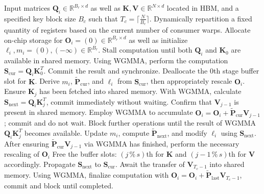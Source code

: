 \begin{algorithm}[H]
    \caption{\small\label{alg:flash3_wgmma}\textsc{FlashAttention-3} consumer warpgroup forward pass}
    \begin{algorithmic}[1]
      \REQUIRE  Input matrices $\mathbf{Q}_i \in \mathbb{R}^{B_r \times d}$ as well as $\mathbf{K}, \mathbf{V} \in \mathbb{R}^{N \times d}$ located in HBM, and a specified key block size $B_c$ such that $T_c = \lceil \frac{N}{B_c} \rceil$.
      \STATE Dynamically repartition a fixed quantity of registers based on the current number of consumer warps.
      \STATE Allocate on-chip storage for $\mathbf{O}_i = (0) \in \mathbb{R}^{B_r \times d}$ as well as initialize $\ell_i, m_i = (0), (-\infty) \in \mathbb{R}^{B_r}$.
      \STATE Stall computation until both $\mathbf{Q}_i$ and $\mathbf{K}_0$ are available in shared memory.
      \STATE Using WGMMA, perform the computation $\mathbf{S}_{\mathrm{cur}} = \mathbf{Q}_i \mathbf{K}_0^T$. Commit the result and synchronize.
      \STATE Deallocate the $0$th stage buffer slot for $\mathbf{K}$.
      \STATE Derive $m_{i}$, $\tilde{\mathbf{P}}_{\mathrm{cur}}$, and $\ell_{i}$ from $\mathbf{S}_{\mathrm{cur}}$, then appropriately rescale $\mathbf{O}_i$.
        \STATE Ensure $\mathbf{K}_j$ has been fetched into shared memory.
        \label{code:mainloop_start}
        \STATE With WGMMA, calculate $\mathbf{S}_{\mathrm{next}} = \mathbf{Q}_i \mathbf{K}_{j}^T$, commit immediately without waiting. \label{code:first_wgmma}
        \STATE Confirm that $\mathbf{V}_{j-1}$ is present in shared memory.
        \STATE Employ WGMMA to accumulate $\mathbf{O}_{i} = \mathbf{O}_{i} + \tilde{\mathbf{P}}_{\mathrm{cur}} \mathbf{V}_{j-1}$; commit and do not wait. \label{code:second_wgmma}
        \STATE Block further operations until the result of WGMMA $\mathbf{Q}_i \mathbf{K}_{j}^T$ becomes available.
        \STATE Update $m_{i}$, compute $\tilde{\mathbf{P}}_{\mathrm{next}}$, and modify $\ell_{i}$ using $\mathbf{S}_{\mathrm{next}}$. \label{code:softmax}
        \STATE After ensuring $\tilde{\mathbf{P}}_{\mathrm{cur}} \mathbf{V}_{j-1}$ via WGMMA has finished, perform the necessary rescaling of $\mathbf{O}_i$
        \STATE Free the buffer slots: $(j\,\%\,s)$th for $\mathbf{K}$ and $(j-1\,\%\,s)$th for $\mathbf{V}$ accordingly.
        \STATE Propagate $\mathbf{S}_{\mathrm{next}}$ to $\mathbf{S}_{\mathrm{cur}}$.
        \label{code:mainloop_end}
      \ENDFOR \STATE Await the transfer of $\mathbf{V}_{T_c - 1}$ into shared memory.
      \STATE Using WGMMA, finalize computation with
      $\mathbf{O}_{i} = \mathbf{O}_{i} + \tilde{\mathbf{P}}_{\mathrm{last}} \mathbf{V}_{T_c - 1}$, commit and block until completed.


\end{algorithmic}
\end{algorithm}
